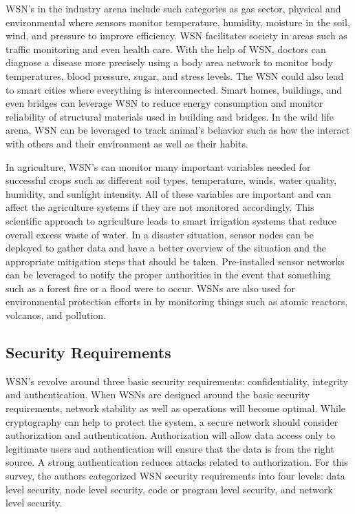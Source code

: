 WSN’s in the industry arena include such categories as gas sector, physical and environmental where sensors monitor temperature, humidity, moisture in the soil, wind, and pressure to improve efficiency. WSN facilitates society in areas such as traffic monitoring and even health care. With the help of WSN, doctors can diagnose a disease more precisely using a body area network to monitor body temperatures, blood pressure, sugar, and stress levels. The WSN could also lead to smart cities where everything is interconnected. Smart homes, buildings, and even bridges can leverage WSN to reduce energy consumption and monitor reliability of structural materials used in building and bridges. In the wild life arena, WSN can be leveraged to track animal’s behavior such as how the interact with others and their environment as well as their habits. \cite {bangash2017security}

\smallskip

In agriculture, WSN’s can monitor many important variables needed for successful crops such as different soil types, temperature, winds, water quality, humidity, and sunlight intensity. All of these variables are important and can affect the agriculture systems if they are not monitored accordingly. This scientific approach to agriculture leads to smart irrigation systems that reduce overall excess waste of water. In a disaster situation, sensor nodes can be deployed to gather data and have a better overview of the situation and the appropriate mitigation steps that should be taken. Pre-installed sensor networks can be leveraged to notify the proper authorities in the event that something such as a forest fire or a flood were to occur. WSNs are also used for environmental protection efforts in by monitoring things such as atomic reactors, volcanos, and pollution. \cite {bangash2017security}

\subsection {Security Requirements} 

WSN’s revolve around three basic security requirements: confidentiality, integrity and authentication. When WSNs are designed around the basic security requirements, network stability as well as operations will become optimal. While cryptography can help to protect the system, a secure network should consider authorization and authentication. Authorization will allow data access only to legitimate users and authentication will ensure that the data is from the right source. A strong authentication reduces attacks related to authorization. For this survey, the authors categorized WSN security requirements into four levels: data level security, node level security, code or program level security, and network level security. \cite {karakaya2018survey}

